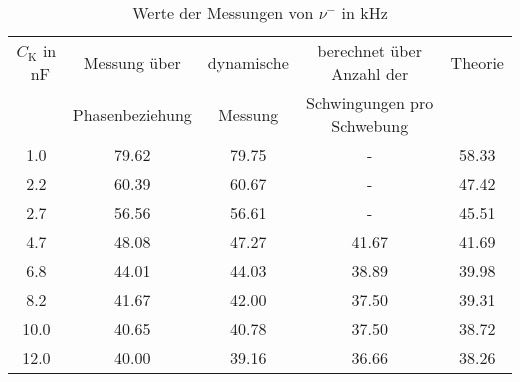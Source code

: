 \begin{table}[h!]
\begin{center}
\begin{tabular}{c | c | c | c | c}
	$C_\text{K}$ in \SI{}{\nano\farad} & Messung über & dynamische & berechnet über Anzahl der & Theorie \\
	& Phasenbeziehung & Messung & Schwingungen pro Schwebung & \\
\hline
	1.0 & 79.62 & 79.75 & - & 58.33 \\
	2.2 & 60.39 & 60.67 & - & 47.42 \\
	2.7 & 56.56 & 56.61 & - & 45.51 \\
	4.7 & 48.08 & 47.27 & 41.67 & 41.69 \\
	6.8 & 44.01 & 44.03 & 38.89 & 39.98 \\
	8.2 & 41.67 & 42.00 & 37.50 & 39.31 \\
	10.0 & 40.65 & 40.78 & 37.50 & 38.72 \\
	12.0 & 40.00 & 39.16 & 36.66 & 38.26 \\
\end{tabular}
\end{center}
\caption{Werte der Messungen von $\nu^-$ in \si{\kilo\hertz}}
\label{fig:FreqMinus}
\end{table}